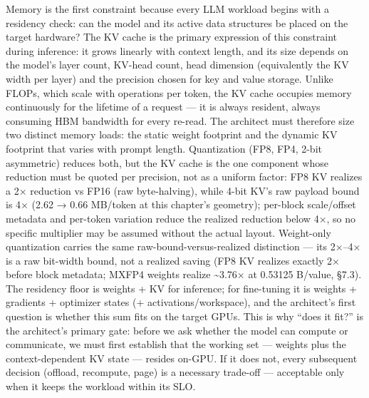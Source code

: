 \label{concept}


Memory is the first constraint because every LLM workload begins with a
residency check: can the model and its active data structures be placed
on the target hardware? The KV cache is the primary expression of this
constraint during inference: it grows linearly with context length, and
its size depends on the model's layer count, KV-head count, head
dimension (equivalently the KV width per layer) and the precision chosen
for key and value storage. Unlike FLOPs, which scale with operations per
token, the KV cache occupies memory continuously for the lifetime of a
request --- it is always resident, always consuming HBM bandwidth for
every re-read. The architect must therefore size two distinct memory
loads: the static weight footprint and the dynamic KV footprint that
varies with prompt length. Quantization (FP8, FP4, 2-bit asymmetric)
reduces both, but the KV cache is the one component whose reduction must
be quoted per precision, not as a uniform factor: FP8 KV realizes a 2×
reduction vs FP16 (raw byte-halving), while 4-bit KV's raw payload bound
is 4× (2.62 → 0.66 MB/token at this chapter's geometry); per-block
scale/offset metadata and per-token variation reduce the realized
reduction below 4×, so no specific multiplier may be assumed without the
actual layout. Weight-only quantization carries the same
raw-bound-versus-realized distinction --- its 2×--4× is a raw bit-width
bound, not a realized saving (FP8 KV realizes exactly 2× before block
metadata; MXFP4 weights realize \textasciitilde3.76× at 0.53125 B/value,
§7.3). The residency floor is weights + KV for inference; for
fine-tuning it is weights + gradients + optimizer states (+
activations/workspace), and the architect's first question is whether
this sum fits on the target GPUs. This is why ``does it fit?'' is the
architect's primary gate: before we ask whether the model can compute or
communicate, we must first establish that the working set --- weights
plus the context-dependent KV state --- resides on-GPU. If it does not,
every subsequent decision (offload, recompute, page) is a necessary
trade-off --- acceptable only when it keeps the workload within its SLO.

